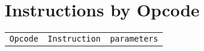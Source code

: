 \documentclass[english,11pt,twoside,toc=bib,toc=idx]{scrreprt}
\newcommand{\ARCH}{z/\kern-1pt Ar\-chi\-tec\-ture}
\newcommand{\ARCH}{ESA/390}
\begin{document}
\chapter{Instructions by Opcode}
\begin{longtable}{lll}
  \toprule
  \texttt{Opcode} & \texttt{Instruction} & \texttt{parameters} \\
  
\end{longtable}


\newcommand{\bibTitle}[1]{``#1''}

\begin{thebibliography}{9}

  
\end{thebibliography}

\printindex
\end{document}
